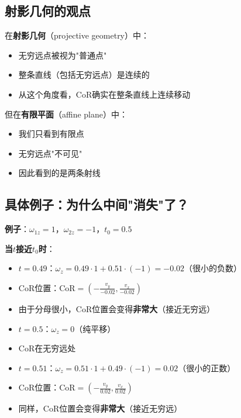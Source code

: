 \documentclass[12pt,a4paper]{article}
\begin{document}
\subsection{射影几何的观点}

在\textbf{射影几何}（projective geometry）中：

\begin{itemize}
\item 无穷远点被视为"普通点"
\item 整条直线（包括无穷远点）是连续的
\item 从这个角度看，CoR确实在整条直线上连续移动
\end{itemize}

但在\textbf{有限平面}（affine plane）中：

\begin{itemize}
\item 我们只看到有限点
\item 无穷远点"不可见"
\item 因此看到的是两条射线
\end{itemize}

\subsection{具体例子：为什么中间"消失"了？}

\textbf{例子}：$\omega_{1z} = 1$，$\omega_{2z} = -1$，$t_0 = 0.5$

\textbf{当$t$接近$t_0$时}：

\begin{itemize}
\item $t = 0.49$：$\omega_z = 0.49 \cdot 1 + 0.51 \cdot (-1) = -0.02$（很小的负数）
\item CoR位置：$\text{CoR} = \left(-\frac{v_y}{-0.02}, \frac{v_x}{-0.02}\right)$
\item 由于分母很小，CoR位置会变得\textbf{非常大}（接近无穷远）

\item $t = 0.5$：$\omega_z = 0$（纯平移）
\item CoR在无穷远处

\item $t = 0.51$：$\omega_z = 0.51 \cdot 1 + 0.49 \cdot (-1) = 0.02$（很小的正数）
\item CoR位置：$\text{CoR} = \left(-\frac{v_y}{0.02}, \frac{v_x}{0.02}\right)$
\item 同样，CoR位置会变得\textbf{非常大}（接近无穷远）
\end{itemize}
\end{document}
